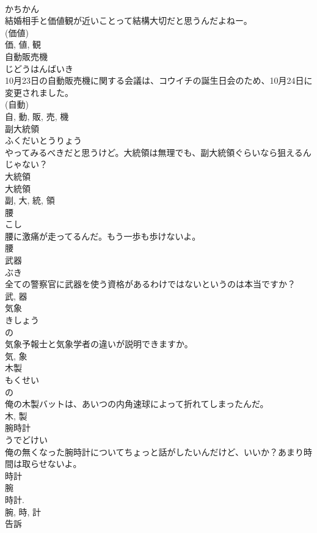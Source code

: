 \documentclass[8pt]{extreport}
\begin{document}
\begin{CJK}{UTF8}{min}
\\	かちかん	
\\	結婚相手と価値観が近いことって結構大切だと思うんだよねー。	
\\	(価値) 
\\	価, 値, 観	
\\	自動販売機	
\\	じどうはんばいき	
\\	10月23日の自動販売機に関する会議は、コウイチの誕生日会のため、10月24日に変更されました。	
\\	(自動) 
\\	自, 動, 販, 売, 機	
\\	副大統領	
\\	ふくだいとうりょう	
\\	やってみるべきだと思うけど。大統領は無理でも、副大統領ぐらいなら狙えるんじゃない？	
\\	大統領 
\\	大統領 
\\	副, 大, 統, 領	
\\	腰	
\\	こし	
\\	腰に激痛が走ってるんだ。もう一歩も歩けないよ。	
\\	腰	
\\	武器	
\\	ぶき	
\\	全ての警察官に武器を使う資格があるわけではないというのは本当ですか？	
\\	武, 器	
\\	気象	
\\	きしょう	
\\	の 
\\	気象予報士と気象学者の違いが説明できますか。	
\\	気, 象	
\\	木製	
\\	もくせい	
\\	の 
\\	俺の木製バットは、あいつの内角速球によって折れてしまったんだ。	
\\	木, 製	
\\	腕時計	
\\	うでどけい	
\\	俺の無くなった腕時計についてちょっと話がしたいんだけど、いいか？あまり時間は取らせないよ。	
\\	時計 
\\	腕 
\\	時計. 
\\	腕, 時, 計	
\\	告訴	

\end{CJK}
\end{document}
